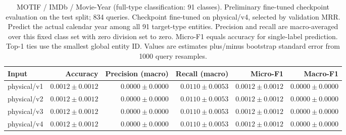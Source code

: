 \begin{table}[t]
\centering
\small
\begin{tabular}{lrrrrr}
\toprule
Input & Accuracy & Precision (macro) & Recall (macro) & Micro-F1 & Macro-F1 \\
\midrule
physical/v1 & $0.0012 \pm 0.0012$ & $0.0000 \pm 0.0000$ & $0.0110 \pm 0.0053$ & $0.0012 \pm 0.0012$ & $0.0000 \pm 0.0000$ \\
physical/v2 & $0.0012 \pm 0.0012$ & $0.0000 \pm 0.0000$ & $0.0110 \pm 0.0053$ & $0.0012 \pm 0.0012$ & $0.0000 \pm 0.0000$ \\
physical/v3 & $0.0012 \pm 0.0012$ & $0.0000 \pm 0.0000$ & $0.0110 \pm 0.0053$ & $0.0012 \pm 0.0012$ & $0.0000 \pm 0.0000$ \\
physical/v4 & $0.0012 \pm 0.0012$ & $0.0000 \pm 0.0000$ & $0.0110 \pm 0.0053$ & $0.0012 \pm 0.0012$ & $0.0000 \pm 0.0000$ \\
\bottomrule
\end{tabular}
\caption{MOTIF / IMDb / Movie-Year (full-type classification: 91 classes). Preliminary fine-tuned checkpoint evaluation on the test split; 834 queries. Checkpoint fine-tuned on physical/v4, selected by validation MRR. Predict the actual calendar year among all 91 target-type entities. Precision and recall are macro-averaged over this fixed class set with zero division set to zero. Micro-F1 equals accuracy for single-label prediction. Top-1 ties use the smallest global entity ID. Values are estimates plus/minus bootstrap standard error from 1000 query resamples.}
\label{tab:motif-movie_year-classification}
\end{table}
